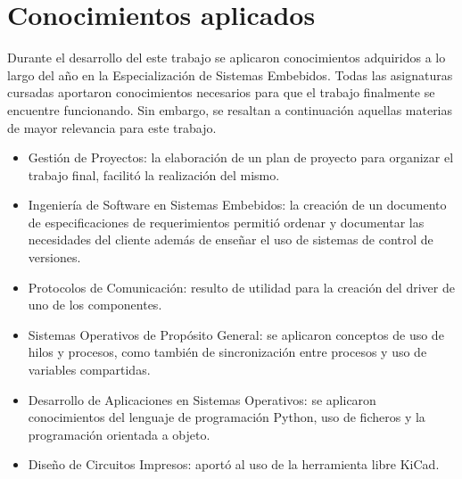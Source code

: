 

\section{Conocimientos aplicados }

Durante el desarrollo del este trabajo se aplicaron conocimientos adquiridos a lo largo del año en la Especialización de Sistemas Embebidos. Todas las asignaturas cursadas aportaron conocimientos necesarios para que el trabajo finalmente se encuentre funcionando. Sin embargo, se resaltan a continuación aquellas materias de mayor relevancia para este trabajo.

\begin{itemize}
\item Gestión de Proyectos: la elaboración de un plan de proyecto para organizar el trabajo final, facilitó la realización del mismo.
\item Ingeniería de Software en Sistemas Embebidos: la creación de un documento de especificaciones de requerimientos permitió ordenar y documentar las necesidades del cliente además de enseñar el uso de sistemas de control de versiones.
\item Protocolos de Comunicación: resulto de utilidad para la creación del driver de uno de los componentes.
\item Sistemas Operativos de Propósito General: se aplicaron conceptos de uso de hilos y procesos, como también de sincronización entre procesos y uso de variables compartidas.
\item Desarrollo de Aplicaciones en Sistemas Operativos: se aplicaron conocimientos del lenguaje de programación Python, uso de ficheros y la programación orientada a objeto.
\item Diseño de Circuitos Impresos: aportó al uso de la herramienta libre KiCad.
\end{itemize}



